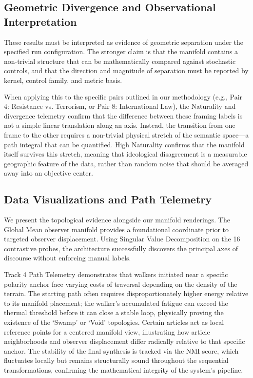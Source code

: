 \subsection{Geometric Divergence and Observational Interpretation}

These results must be interpreted as evidence of geometric separation under the specified run configuration. The stronger claim is that the manifold contains a non-trivial structure that can be mathematically compared against stochastic controls, and that the direction and magnitude of separation must be reported by kernel, control family, and metric basis. 

When applying this to the specific pairs outlined in our methodology (e.g., Pair 4: Resistance vs. Terrorism, or Pair 8: International Law), the Naturality and divergence telemetry confirm that the difference between these framing labels is not a simple linear translation along an axis. Instead, the transition from one frame to the other requires a non-trivial physical stretch of the semantic space---a path integral that can be quantified. High Naturality confirms that the manifold itself survives this stretch, meaning that ideological disagreement is a measurable geographic feature of the data, rather than random noise that should be averaged away into an objective center.

\subsection{Data Visualizations and Path Telemetry}

We present the topological evidence alongside our manifold renderings. The Global Mean observer manifold provides a foundational coordinate prior to targeted observer displacement. Using Singular Value Decomposition on the 16 contrastive probes, the architecture successfully discovers the principal axes of discourse without enforcing manual labels. 

Track 4 Path Telemetry demonstrates that walkers initiated near a specific polarity anchor face varying costs of traversal depending on the density of the terrain. The starting path often requires disproportionately higher energy relative to its manifold placement; the walker's accumulated fatigue can exceed the thermal threshold before it can close a stable loop, physically proving the existence of the `Swamp' or `Void' topologies. Certain articles act as local reference points for a centered manifold view, illustrating how article neighborhoods and observer displacement differ radically relative to that specific anchor. The stability of the final synthesis is tracked via the NMI score, which fluctuates locally but remains structurally sound throughout the sequential transformations, confirming the mathematical integrity of the system's pipeline.




